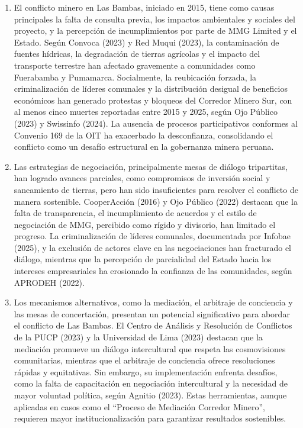 \documentclass[
  stu,
  floatsintext,
  longtable,
  a4paper,
  nolmodern,
  notxfonts,
  notimes,
  colorlinks=true,linkcolor=blue,citecolor=blue,urlcolor=blue]{apa7}
\begin{document}
\begin{enumerate}
\def\labelenumi{\arabic{enumi}.}
\item
  El conflicto minero en Las Bambas, iniciado en 2015, tiene como causas
  principales la falta de consulta previa, los impactos ambientales y
  sociales del proyecto, y la percepción de incumplimientos por parte de
  MMG Limited y el Estado. Según Convoca (2023) y Red Muqui (2023), la
  contaminación de fuentes hídricas, la degradación de tierras agrícolas
  y el impacto del transporte terrestre han afectado gravemente a
  comunidades como Fuerabamba y Pumamarca. Socialmente, la reubicación
  forzada, la criminalización de líderes comunales y la distribución
  desigual de beneficios económicos han generado protestas y bloqueos
  del Corredor Minero Sur, con al menos cinco muertes reportadas entre
  2015 y 2025, según Ojo Público (2023) y Swissinfo (2024). La ausencia
  de procesos participativos conformes al Convenio 169 de la OIT ha
  exacerbado la desconfianza, consolidando el conflicto como un desafío
  estructural en la gobernanza minera peruana.
\item
  Las estrategias de negociación, principalmente mesas de diálogo
  tripartitas, han logrado avances parciales, como compromisos de
  inversión social y saneamiento de tierras, pero han sido insuficientes
  para resolver el conflicto de manera sostenible. CooperAcción (2016) y
  Ojo Público (2022) destacan que la falta de transparencia, el
  incumplimiento de acuerdos y el estilo de negociación de MMG,
  percibido como rígido y divisorio, han limitado el progreso. La
  criminalización de líderes comunales, documentada por Infobae (2025),
  y la exclusión de actores clave en las negociaciones han fracturado el
  diálogo, mientras que la percepción de parcialidad del Estado hacia
  los intereses empresariales ha erosionado la confianza de las
  comunidades, según APRODEH (2022).
\item
  Los mecanismos alternativos, como la mediación, el arbitraje de
  conciencia y las mesas de concertación, presentan un potencial
  significativo para abordar el conflicto de Las Bambas. El Centro de
  Análisis y Resolución de Conflictos de la PUCP (2023) y la Universidad
  de Lima (2023) destacan que la mediación promueve un diálogo
  intercultural que respeta las cosmovisiones comunitarias, mientras que
  el arbitraje de conciencia ofrece resoluciones rápidas y equitativas.
  Sin embargo, su implementación enfrenta desafíos, como la falta de
  capacitación en negociación intercultural y la necesidad de mayor
  voluntad política, según Agnitio (2023). Estas herramientas, aunque
  aplicadas en casos como el ``Proceso de Mediación Corredor Minero'',
  requieren mayor institucionalización para garantizar resultados
  sostenibles.
\end{enumerate}
\end{document}
